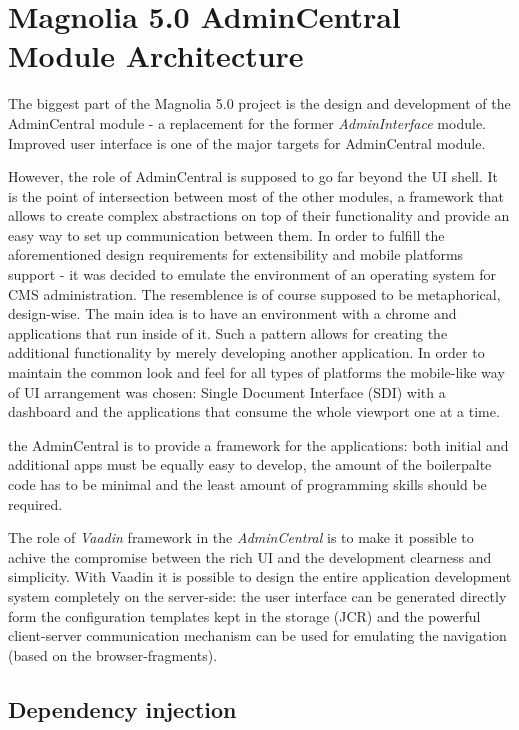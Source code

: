 \chapter{Magnolia 5.0 AdminCentral Module Architecture}
\label{architecture}

The biggest part of the Magnolia 5.0 project is the design and development of
the AdminCentral module - a replacement for the former \emph{AdminInterface}
module. Improved user interface is one of the major targets for AdminCentral
module.

However, the role of AdminCentral is supposed to go far beyond the UI
shell. It is the point of intersection between most of the other modules, a
framework that allows to create complex abstractions on top of their
functionality and provide an easy way to set up communication between them.
In order to fulfill the aforementioned design requirements for extensibility and
mobile platforms support - it was decided to emulate the environment of an
operating system for CMS administration. The resemblence is of course supposed
to be metaphorical, design-wise. The main idea is to have an environment with a
chrome and applications that run inside of it. Such a pattern allows for
creating the additional functionality by merely developing another application.
In order to maintain the common look and feel for all types of platforms the
mobile-like way of UI arrangement was chosen: Single Document Interface (SDI)
with a dashboard and the applications that consume the whole viewport one at a
time.

the AdminCentral is to provide a framework for the applications: both
initial and additional apps must be equally easy to develop, the amount of the
boilerpalte code has to be minimal and the least amount of programming skills
should be required.

The role of \emph{Vaadin} framework in the \emph{AdminCentral} is to make it
possible to achive the compromise between the rich UI and the development
clearness and simplicity.
With Vaadin it is possible to design the entire application development system
completely on the server-side: the user interface can be generated directly form
the configuration templates kept in the storage (JCR) and the powerful
client-server communication mechanism can be used for emulating the navigation
 (based on the browser-fragments).









\section{Dependency injection}


\pagebreak